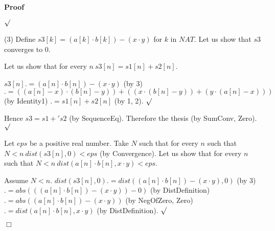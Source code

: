 \documentclass{article}
\newenvironment{forthel}{\begin{leftbar}}{\end{leftbar}}
\newenvironment{proof}{\noindent\textbf{Proof\ }}{\hspace*{\fill}$\Box$\medskip}
\newenvironment{subproof}{\begin{list}{}{}
		\item[\text{Proof}]}{\hfill $\surd$ \end{list}}
\begin{document}
\begin{forthel}
\begin{proof}
\begin{subproof}
	\end{subproof}
	(3) Define $s3[k] = (a[k] \cdot b[k]) - (x \cdot y)$ for $k$ in $NAT$.
	Let us show that $s3$ converges to $0$.
	\begin{subproof}
	Let us show that for every $n \ s3[n] = s1[n] + s2[n]$.
	\begin{subproof}
	$s3[n] .= (a[n] \cdot b[n]) - (x \cdot y)$ (by 3)
	$.= ((a[n] - x) \cdot (b[n] - y)) + ((x \cdot (b[n] - y)) + (y \cdot (a[n] - x)))$ (by Identity1)
	$.= s1[n] + s2[n]$ (by 1, 2).
	\end{subproof}
	Hence $s3 = s1 +' s2$ (by SequenceEq).
	Therefore the thesis (by SumConv, Zero).
	\end{subproof}
	Let $eps$ be a positive real number.
	Take $N$ such that for every $n$ such that $N < n \ dist(s3[n],0) < eps$ (by Convergence).
	Let us show that for every $n$ such that $N < n \ dist(a[n] \cdot b[n],x \cdot y) < eps$.
	\begin{subproof}
	Assume $N < n$.
	$dist(s3[n],0) .= dist((a[n] \cdot b[n]) - (x \cdot y),0)$ (by 3)
	$.= abs(((a[n] \cdot b[n]) - (x \cdot y)) - 0)$ (by DistDefinition)
	$.= abs((a[n] \cdot b[n]) - (x \cdot y))$ (by NegOfZero, Zero)
	$.= dist(a[n] \cdot b[n],x \cdot y)$ (by DistDefinition).
	\end{subproof}
	\end{proof}


\end{forthel}
\end{document}
